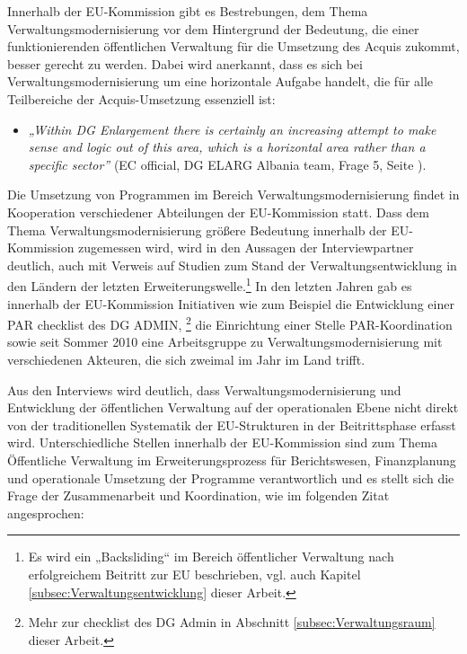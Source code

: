 Innerhalb der EU-Kommission gibt es Bestrebungen, dem Thema Verwaltungsmodernisierung vor dem Hintergrund der Bedeutung, die einer funktionierenden öffentlichen Verwaltung für die Umsetzung des Acquis zukommt, besser gerecht zu werden. Dabei wird anerkannt, dass es sich bei Verwaltungsmodernisierung um eine horizontale Aufgabe handelt, die für alle Teilbereiche der Acquis-Umsetzung essenziell ist:
\begin{itemize}[label={}]
\item \textit{„Within DG Enlargement there is certainly an increasing attempt to make sense and logic out of this area, which is a horizontal area rather than a specific sector”} (EC official, DG ELARG Albania team, Frage 5, Seite \pageref{sec:admin}).
\end{itemize}
Die Umsetzung von Programmen im Bereich Verwaltungsmodernisierung findet in Kooperation verschiedener Abteilungen der EU-Kommission statt. Dass dem Thema Verwaltungsmodernisierung größere Bedeutung innerhalb der EU-Kommission zugemessen wird, wird in den Aussagen der Interviewpartner deutlich, auch mit Verweis auf Studien zum Stand der Verwaltungsentwicklung in den Ländern der letzten Erweiterungswelle.\footnote{Es wird ein „Backsliding“ im Bereich öffentlicher Verwaltung nach erfolgreichem Beitritt zur EU beschrieben, vgl. auch Kapitel \ref{subsec:Verwaltungsentwicklung} dieser Arbeit.} In den letzten Jahren gab es innerhalb der EU-Kommission Initiativen wie zum Beispiel die Entwicklung einer PAR checklist des DG ADMIN, \footnote{Mehr zur checklist des DG Admin in Abschnitt \ref{subsec:Verwaltungsraum} dieser Arbeit.} die Einrichtung einer Stelle PAR-Koordination sowie seit Sommer 2010 eine Arbeitsgruppe zu Verwaltungsmodernisierung mit verschiedenen Akteuren, die sich zweimal im Jahr im Land trifft.\par
Aus den Interviews wird deutlich, dass Verwaltungsmodernisierung und Entwicklung der öffentlichen Verwaltung auf der operationalen Ebene nicht direkt von der traditionellen Systematik der EU-Strukturen in der Beitrittsphase erfasst wird. Unterschiedliche Stellen innerhalb der EU-Kommission sind zum Thema Öffentliche Verwaltung im Erweiterungsprozess für Berichtswesen, Finanzplanung und operationale Umsetzung der Programme verantwortlich und es stellt sich die Frage der Zusammenarbeit und Koordination, wie im folgenden Zitat angesprochen:
